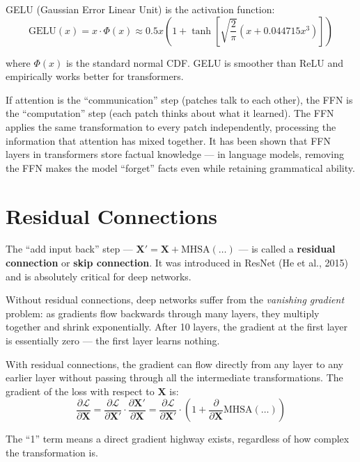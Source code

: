 \documentclass[12pt, a4paper]{report}
\newcommand{\mat}[1]{\mathbf{#1}}
\begin{document}
GELU (Gaussian Error Linear Unit) is the activation function:
\begin{equation}
\text{GELU}(x) = x \cdot \Phi(x) \approx 0.5x\left(1 + \tanh\!\left[\sqrt{\frac{2}{\pi}}(x + 0.044715 x^3)\right]\right)
\end{equation}

where $\Phi(x)$ is the standard normal CDF. GELU is smoother than ReLU and empirically works better for transformers.

\begin{intuitionbox}
If attention is the ``communication'' step (patches talk to each other), the FFN is the ``computation'' step (each patch thinks about what it learned). The FFN applies the same transformation to every patch independently, processing the information that attention has mixed together. It has been shown that FFN layers in transformers store factual knowledge — in language models, removing the FFN makes the model ``forget'' facts even while retaining grammatical ability.
\end{intuitionbox}

\section{Residual Connections}

The ``add input back'' step — $\mat{X}' = \mat{X} + \text{MHSA}(\ldots)$ — is called a \textbf{residual connection} or \textbf{skip connection}. It was introduced in ResNet (He et al., 2015) and is absolutely critical for deep networks.

\begin{conceptbox}
Without residual connections, deep networks suffer from the \emph{vanishing gradient} problem: as gradients flow backwards through many layers, they multiply together and shrink exponentially. After 10 layers, the gradient at the first layer is essentially zero — the first layer learns nothing.

With residual connections, the gradient can flow directly from any layer to any earlier layer without passing through all the intermediate transformations. The gradient of the loss with respect to $\mat{X}$ is:
\begin{equation}
\frac{\partial \mathcal{L}}{\partial \mat{X}} = \frac{\partial \mathcal{L}}{\partial \mat{X}'} \cdot \frac{\partial \mat{X}'}{\partial \mat{X}} = \frac{\partial \mathcal{L}}{\partial \mat{X}'} \cdot \left(1 + \frac{\partial}{\partial \mat{X}}\text{MHSA}(\ldots)\right)
\end{equation}

The ``1'' term means a direct gradient highway exists, regardless of how complex the transformation is.
\end{conceptbox}
\end{document}

